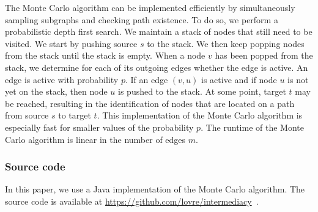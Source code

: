 \documentclass[9pt,twocolumn,twoside]{pnas-alt} %
\theoremstyle{definition}
\begin{document}
{The Monte Carlo algorithm can be implemented efficiently by simultaneously sampling subgraphs and checking path existence. To do so, we perform a probabilistic depth first search. We maintain a stack of nodes that still need to be visited. We start by pushing source $s$ to the stack. We then keep popping nodes from the stack until the stack is empty. When a node $v$ has been popped from the stack, we determine for each of its outgoing edges whether the edge is active. An edge is active with probability $p$. If an edge $(v, u)$ is active and if node $u$ is not yet on the stack, then node $u$ is pushed to the stack. At some point, target $t$ may be reached, resulting in the identification of nodes that are located on a path from source $s$ to target $t$. This implementation of the Monte Carlo algorithm is especially fast for smaller values of the probability $p$. The runtime of the Monte Carlo algorithm is linear in the number of edges $m$.

\subsubsection*{\label{sec:source}Source code}

In this paper, we use a Java implementation of the Monte Carlo algorithm. The source code is available at \url{https://github.com/lovre/intermediacy}~\cite{intermediacy}.

}

\showmatmethods{}


\showacknow{}

%
%


\end{document}
